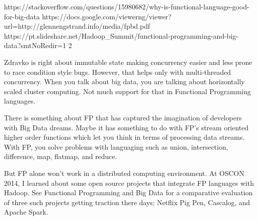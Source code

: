 https://stackoverflow.com/questions/15980682/why-is-functional-language-good-for-big-data
https://docs.google.com/viewerng/viewer?url=http://glennengstrand.info/media/fpbd.pdf
https://pt.slideshare.net/Hadoop_Summit/functional-programming-and-big-data?smtNoRedir=1
2

Zdravko is right about immutable state making concurrency easier and less prone to race condition style bugs. However, that helps only with multi-threaded concurrency. When you talk about big data, you are talking about horizontally scaled cluster computing. Not much support for that in Functional Programming languages.

There is something about FP that has captured the imagination of developers with Big Data dreams. Maybe it has something to do with FP's stream oriented higher order functions which let you think in terms of processing data streams. With FP, you solve problems with languaging such as union, intersection, difference, map, flatmap, and reduce.

But FP alone won't work in a distributed computing environment. At OSCON 2014, I learned about some open source projects that integrate FP languages with Hadoop. See Functional Programming and Big Data for a comparative evaluation of three such projects getting traction there days; Netflix Pig Pen, Cascalog, and Apache Spark.
